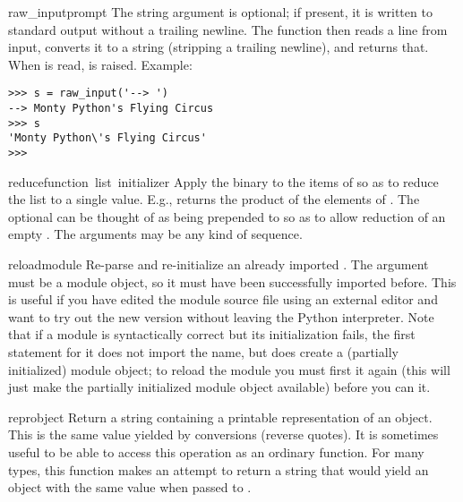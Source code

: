 \begin{funcdesc}{raw_input}{prompt}
  The string argument is optional; if present, it is written to
  standard
  output without a trailing newline.  The function then reads a line
  from input, converts it to a string (stripping a trailing newline),
  and returns that.  When \EOF{} is read,  is raised.
  Example:

\bcode\begin{verbatim}
>>> s = raw_input('--> ')
--> Monty Python's Flying Circus
>>> s
'Monty Python\'s Flying Circus'
>>> 
\end{verbatim}\ecode
\end{funcdesc}

\begin{funcdesc}{reduce}{function\, list\, initializer}
Apply the binary  to the items of  so as to
reduce the list to a single value.  E.g.,
 returns the product of
the elements of .  The optional  can be
thought of as being prepended to  so as to allow reduction
of an empty .  The  arguments may be any kind of
sequence.
\end{funcdesc}

\begin{funcdesc}{reload}{module}
  Re-parse and re-initialize an already imported .  The
  argument must be a module object, so it must have been successfully
  imported before.  This is useful if you have edited the module source
  file using an external editor and want to try out the new version
  without leaving the Python interpreter.  Note that if a module is
  syntactically correct but its initialization fails, the first
   statement for it does not import the name, but does
  create a (partially initialized) module object; to reload the module
  you must first  it again (this will just make the
  partially initialized module object available) before you can
   it.
\end{funcdesc}

\begin{funcdesc}{repr}{object}
Return a string containing a printable representation of an object.
This is the same value yielded by conversions (reverse quotes).
It is sometimes useful to be able to access this operation as an
ordinary function.  For many types, this function makes an attempt
to return a string that would yield an object with the same value
when passed to .
\end{funcdesc}

